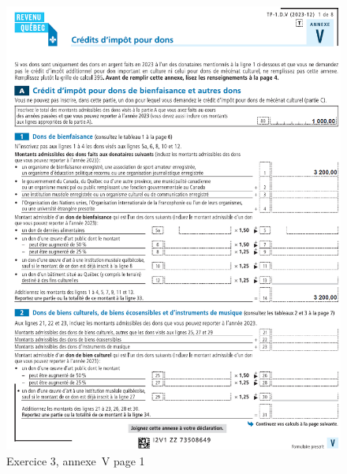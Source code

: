 \begin{figure}
	\centering
	\includegraphics[width=.9\textwidth]{exercice/7-3/Q6/AnnexeVp1.png}
	\caption[]{Exercice 3, annexe~V page 1}
	\label{fig:chap7Exercice3AnnexeVp1}
\end{figure}
